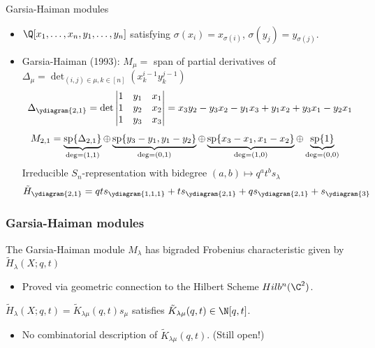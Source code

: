 \documentclass{beamer}
\renewcommand{\Span}{\operatorname{sp}}
\newcounter{c}
\begin{document}
\begin{frame}{Garsia-Haiman modules}
  \begin{itemize}
  \item \(\Q[x_1,\ldots,x_n,y_1,\ldots,y_n]\) satisfying
    \(\sigma(x_i) = x_{\sigma(i)}\), \(\sigma(y_j) = y_{\sigma(j)}\).\pause
  \item Garsia-Haiman (1993): \(M_\mu = \) span of partial derivatives of
    \(\Delta_\mu = \det_{(i,j) \in \mu, k \in [n]} (x_k^{i-1} y_k^{j-1})\) \pause \[
      \Delta_{\ydiagram{2,1}} = \det \left|
        \begin{matrix}
          1 & y_1 & x_1 \\
          1 & y_2 & x_2 \\
          1 & y_3 & x_3
        \end{matrix}
      \right| = x_3 y_2 - y_3 x_2 - y_1 x_3 + y_1 x_2 + y_3 x_1 - y_2 x_1
    \]
    \pause
  \[
    \hspace{-1em}
      M_{2,1} = \underbrace{\Span\{\Delta_{2,1}\}}_{\deg = (1,1)}
      \oplus \underbrace{\Span\{y_3-y_1, y_1 - y_2\}}_{\deg = (0,1)}
      \oplus \underbrace{\Span\{x_3-x_1, x_1 - x_2\}}_{\deg = (1,0)}
      \oplus \underbrace{\Span \{1\}}_{\deg = (0,0)}
    \]
    \pause
    Irreducible \(S_n\)-representation with bidegree \((a,b) \mapsto
    q^at^b s_\lambda\) \pause \[
      \tilde{H}_{\ydiagram{2,1}} = qt s_{\ydiagram{1,1,1}} + t
      s_{\ydiagram{2,1}} + q s_{\ydiagram{2,1}} + s_{\ydiagram{3}}
    \]
  \end{itemize}
\end{frame}
\begin{frame}
  \frametitle{Garsia-Haiman modules}
  \begin{theorem}[Haiman, 2001]
    The Garsia-Haiman module \(M_\lambda\) has bigraded Frobenius
    characteristic given by \(\tilde{H}_\lambda(X;q,t)\)
  \end{theorem}\pause
  \begin{itemize}
  \item Proved via geometric connection to the Hilbert Scheme \(Hilb^n(\C^2)\).\pause
  \end{itemize}
  \begin{corollary}
    \(\tilde{H}_\lambda(X;q,t) = \tilde{K}_{\lambda \mu}(q,t) s_\mu\)
    satisfies \(\tilde{K}_{\lambda \mu}(q,t) \in \N[q,t]\).
  \end{corollary}\pause
  \begin{itemize}
  \item No combinatorial description of \(\tilde{K}_{\lambda
      \mu}(q,t)\). (Still open!)
  \end{itemize}
  \end{frame}
\end{document}
